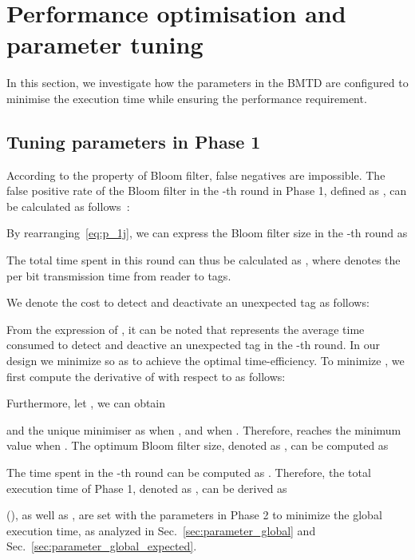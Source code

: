 \documentclass[10pt, twocolumn]{IEEEtran}
\begin{document}
\section{Performance optimisation and parameter tuning}
\label{sec:parameter}

In this section, we investigate how the parameters in the BMTD are configured to minimise the execution time while ensuring the performance requirement.

\subsection{Tuning parameters in Phase 1}

According to the property of Bloom filter, false negatives are impossible. The false positive rate of the Bloom filter  in the -th round in Phase 1, defined as , can be calculated as follows~\cite{bloom1970space}:


By rearranging~\eqref{eq:p_1j}, we can express the Bloom filter size in the -th round as

The total time spent in this round can thus be calculated as , where  denotes the per bit transmission time from reader to tags.

We denote  the cost to detect and deactivate an unexpected tag as follows:

From the expression of , it can be noted that  represents the average time consumed to detect and deactive an unexpected tag in the -th round. In our design we minimize  so as to achieve the optimal time-efficiency. To minimize , we first compute the derivative of  with respect to  as follows:

Furthermore, let , we can obtain

and the unique minimiser  as  when , and  when . Therefore,  reaches the minimum value when . The optimum Bloom filter size, denoted as , can be computed as

The time spent in the -th round can be computed as
.
Therefore, the total execution time of Phase 1, denoted as , can be derived as


 (), as well as , are set with the parameters in Phase 2 to minimize the global execution time, as analyzed in Sec.~\ref{sec:parameter_global} and Sec.~\ref{sec:parameter_global_expected}.

\begin{comment}
It is easy to check that the minimum value  of  equals to  when the number of hash function , where . Since , .
\end{comment}
\end{document}

